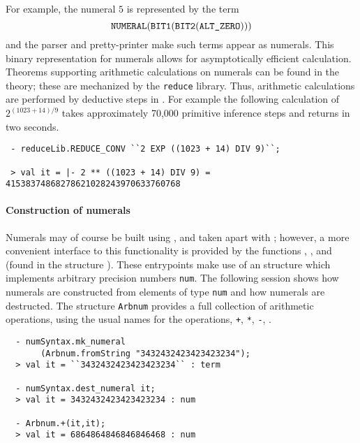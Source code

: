 \noindent For example, the numeral $5$ is represented by the term
\[
   \ml{NUMERAL}(\ml{BIT1}(\ml{BIT2}(\ml{ALT\_ZERO})))
\]
and the \HOL{} parser and pretty-printer make such terms appear as
numerals. This binary representation for numerals allows for
asymptotically efficient calculation. Theorems supporting arithmetic
calculations on numerals can be found in the 
theory; these are mechanized by the \verb+reduce+ library. Thus,
arithmetic calculations are performed by deductive steps in \HOL.
For example the following calculation of $2 ^{(1023 + 14)/9}$ takes
approximately 70,000 primitive inference steps and returns in two
seconds.
%
\begin{boxed}
{\small
\begin{verbatim}
 - reduceLib.REDUCE_CONV ``2 EXP ((1023 + 14) DIV 9)``;

 > val it = |- 2 ** ((1023 + 14) DIV 9) = 41538374868278621028243970633760768
\end{verbatim}}
\end{boxed}

\paragraph {Construction of numerals}

Numerals may of course be built using , and taken apart with
; however, a more convenient interface to this
functionality is provided by the functions ,
, and  (found in the structure
). These entrypoints make use of an \ML{} structure
 which implements arbitrary precision numbers {\verb+num+}. The
following session shows how \HOL{} numerals are constructed from elements of
type \verb+num+ and how numerals are destructed. The structure
{\small\verb+Arbnum+} provides a full collection of arithmetic
operations, using the usual names for the operations, \eg \verb|+|,
\verb|*|, \verb|-|, \etc.

\setcounter{sessioncount}{0}
\begin{session}
\begin{verbatim}
  - numSyntax.mk_numeral
       (Arbnum.fromString "3432432423423423234");
  > val it = ``3432432423423423234`` : term

  - numSyntax.dest_numeral it;
  > val it = 3432432423423423234 : num

  - Arbnum.+(it,it);
  > val it = 6864864846846846468 : num
\end{verbatim}
\end{session}

